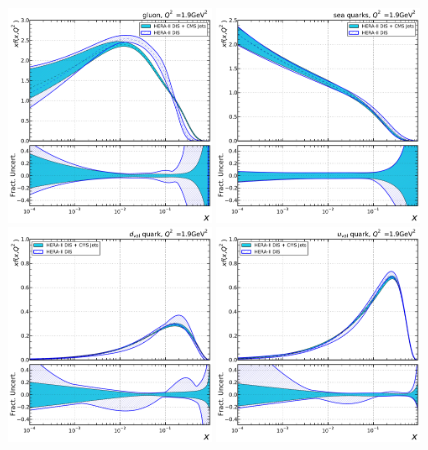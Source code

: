 \begin{figure}[tbp]
  \centering
  \includegraphics[width=0.48\textwidth]{figures/pdf_constraints/direct/HFTD_HERACMSTDJETS_V017_EIG_0_1_9.pdf}\hfill%
  \includegraphics[width=0.48\textwidth]{figures/pdf_constraints/direct/HFTD_HERACMSTDJETS_V017_EIG_9_1_9.pdf}
  \includegraphics[width=0.48\textwidth]{figures/pdf_constraints/direct/HFTD_HERACMSTDJETS_V017_EIG_7_1_9.pdf}\hfill%
  \includegraphics[width=0.48\textwidth]{figures/pdf_constraints/direct/HFTD_HERACMSTDJETS_V017_EIG_8_1_9.pdf}
  \caption{}
  \label{fig:pdfconstraints:direct:19}
\end{figure}




